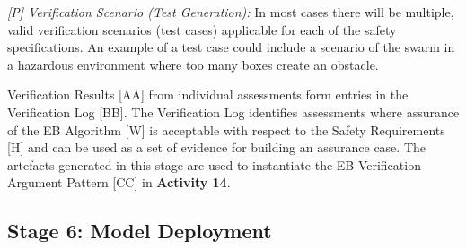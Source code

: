 \documentclass[runningheads]{llncs}
\begin{document}
\emph{[P] Verification Scenario (Test Generation):} In most cases there will be multiple, valid verification scenarios (test cases) applicable for each of the safety specifications.  
An example of a test case could include a scenario of the swarm in a hazardous environment where too many boxes create an obstacle.

Verification Results [AA] from individual assessments form entries in the Verification Log [BB]. The Verification Log identifies assessments where assurance of the EB Algorithm [W] is acceptable with respect to the Safety Requirements [H] and can be used as a set of evidence for building an assurance case. 
The artefacts generated in this stage are used to instantiate the EB Verification Argument Pattern [CC] in \textbf{Activity 14}.

\subsection{Stage 6: Model Deployment} \label{framework-stage6}
\end{document}
